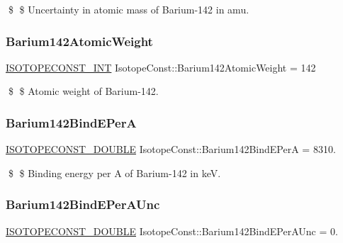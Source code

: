 \$ \$ Uncertainty in atomic mass of Barium-\/142 in amu. \mbox{\label{group___isotope_const-_barium-_ba142_gac53bd9a5edd6110825717f7a5ec7b134}} 
\subsubsection{\texorpdfstring{Barium142\+Atomic\+Weight}{Barium142AtomicWeight}}
{\footnotesize\ttfamily \mbox{\hyperlink{group___isotope_const-_macros_ga5f18360b3e99483a35c32d789e62621c}{I\+S\+O\+T\+O\+P\+E\+C\+O\+N\+S\+T\+\_\+\+I\+NT}} Isotope\+Const\+::\+Barium142\+Atomic\+Weight = 142}

\$ \$ Atomic weight of Barium-\/142. \mbox{\label{group___isotope_const-_barium-_ba142_ga05b630db7874183192627870223135ae}} 
\subsubsection{\texorpdfstring{Barium142\+Bind\+E\+PerA}{Barium142BindEPerA}}
{\footnotesize\ttfamily \mbox{\hyperlink{group___isotope_const-_macros_ga8f45a7272ce02c0b4c65c44636ed719a}{I\+S\+O\+T\+O\+P\+E\+C\+O\+N\+S\+T\+\_\+\+D\+O\+U\+B\+LE}} Isotope\+Const\+::\+Barium142\+Bind\+E\+PerA = 8310.}

\$ \$ Binding energy per A of Barium-\/142 in keV. \mbox{\label{group___isotope_const-_barium-_ba142_ga33318bc3fc0492c7e229055de64e83e9}} 
\subsubsection{\texorpdfstring{Barium142\+Bind\+E\+Per\+A\+Unc}{Barium142BindEPerAUnc}}
{\footnotesize\ttfamily \mbox{\hyperlink{group___isotope_const-_macros_ga8f45a7272ce02c0b4c65c44636ed719a}{I\+S\+O\+T\+O\+P\+E\+C\+O\+N\+S\+T\+\_\+\+D\+O\+U\+B\+LE}} Isotope\+Const\+::\+Barium142\+Bind\+E\+Per\+A\+Unc = 0.}

